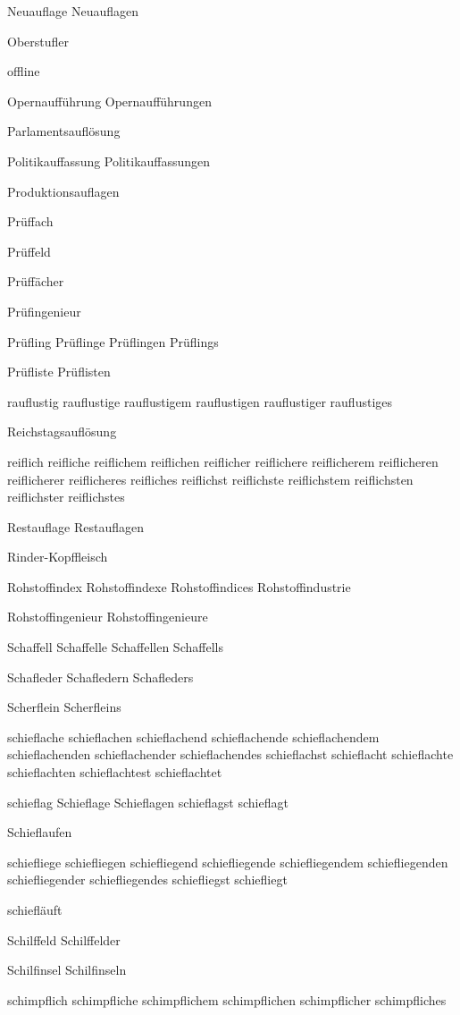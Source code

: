 Neuauflage Neuauflagen

Oberstufler

offline

Opernaufführung Opernaufführungen

Parlamentsauflösung

Politikauffassung Politikauffassungen

Produktionsauflagen

Prüffach

Prüffeld

Prüffächer

Prüfingenieur

Prüfling Prüflinge Prüflingen Prüflings

Prüfliste Prüflisten

rauflustig rauflustige rauflustigem rauflustigen rauflustiger rauflustiges

Reichstagsauflösung

reiflich reifliche reiflichem reiflichen reiflicher reiflichere reiflicherem reiflicheren reiflicherer reiflicheres reifliches reiflichst reiflichste reiflichstem reiflichsten reiflichster reiflichstes

Restauflage Restauflagen

Rinder-Kopffleisch

Rohstoffindex Rohstoffindexe Rohstoffindices Rohstoffindustrie

Rohstoffingenieur Rohstoffingenieure

Schaffell Schaffelle Schaffellen Schaffells

Schafleder Schafledern Schafleders

Scherflein Scherfleins

schieflache schieflachen schieflachend schieflachende schieflachendem schieflachenden schieflachender schieflachendes schieflachst schieflacht schieflachte schieflachten schieflachtest schieflachtet

schieflag Schieflage Schieflagen schieflagst schieflagt

Schieflaufen

schiefliege schiefliegen schiefliegend schiefliegende schiefliegendem schiefliegenden schiefliegender schiefliegendes schiefliegst schiefliegt

schiefläuft

Schilffeld Schilffelder %

Schilfinsel Schilfinseln

schimpflich schimpfliche schimpflichem schimpflichen schimpflicher schimpfliches

